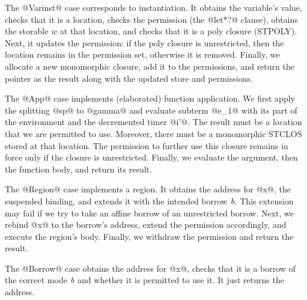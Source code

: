 The @Varinst@ case corresponds to instantiation. It
obtains the variable's value, checks that it is a location, checks the
permission (the @let*?@ clause), obtains the storable $w$ at that
location, and checks that it is a poly closure (STPOLY). Next, it updates the
permission: if the poly closure is unrestricted, then the location
remains in the permission set, otherwise it is removed. Finally, we
allocate a new monomorphic closure, add it to the permissions, and
return the pointer as the result along with the updated store and
permissions.

The @App@ case implements (elaborated) function application.
We first apply the splitting @sp@ to @gamma@ and
evaluate subterm @e_1@ with its part of the environment and the
decremented timer @i'@. The result must be a location that we are
permitted to use. Moreover, there must be a monomorphic STCLOS stored
at that location. The permission to further use this closure  remains
in force only if the closure is unrestricted. Finally, we evaluate the
argument, then the function body, and return its result.



The @Region@ case implements a region. It obtains the address for @x@,
the suspended binding, and extends it with the intended borrow
$\textit{b}$. This extension may fail if we try to take an affine borrow
of an unrestricted borrow. Next, we rebind @x@ to the borrow's
address, extend the permission accordingly, and execute the region's
body.  Finally, we withdraw the permission and return the result.

The @Borrow@ case obtains the address for @x@, checks that it is a
borrow of the correct mode $\textit{b}$ and whether it is permitted to
use it. It just returns the address.

\lstDeleteShortInline@

